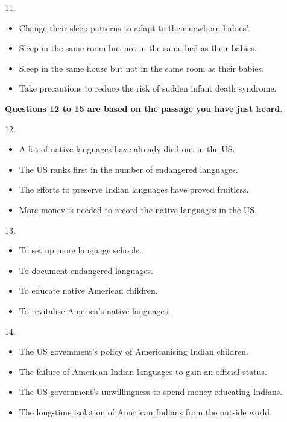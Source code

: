 \documentclass[UTF8,11pt]{ctexart}
\begin{document}
11.


\begin{itemize}[leftmargin=2em,itemsep=.2em,topsep=.4em]\item[A.] Change their sleep patterns to adapt to their newborn babies'.
\item[B.] Sleep in the same room but not in the same bed as their babies.
\item[C.] Sleep in the same house but not in the same room as their babies.
\item[D.] Take precautions to reduce the risk of sudden infant death syndrome.
\end{itemize}

\textbf{Questions 12 to 15 are based on the passage you have just heard.}


12.


\begin{itemize}[leftmargin=2em,itemsep=.2em,topsep=.4em]\item[A.] A lot of native languages have already died out in the US.
\item[B.] The US ranks first in the number of endangered languages.
\item[C.] The efforts to preserve Indian languages have proved fruitless.
\item[D.] More money is needed to record the native languages in the US.
\end{itemize}

13.


\begin{itemize}[leftmargin=2em,itemsep=.2em,topsep=.4em]\item[A.] To set up more language schools.
\item[B.] To document endangered languages.
\item[C.] To educate native American children.
\item[D.] To revitalise America's native languages.
\end{itemize}

14.


\begin{itemize}[leftmargin=2em,itemsep=.2em,topsep=.4em]\item[A.] The US govemment's policy of Americanising Indian children.
\item[B.] The failure of American Indian languages to gain an official status.
\item[C.] The US government's unwillingness to spend money educating Indians.
\item[D.] The long-time isolation of American Indians from the outside world.
\end{itemize}
\end{document}
